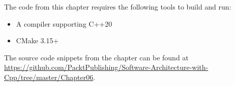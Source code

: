 
The code from this chapter requires the following tools to build and run:

\begin{itemize}
\item A compiler supporting C++20
\item CMake 3.15+
\end{itemize}

The source code snippets from the chapter can be found at \url{https://github.com/PacktPublishing/Software-Architecture-with-Cpp/tree/master/Chapter06}.